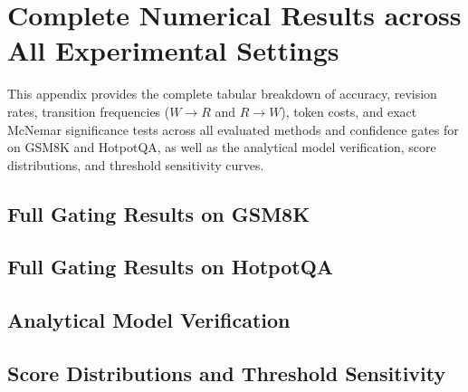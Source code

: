 \section{Complete Numerical Results across All Experimental Settings}
\label{app:full}
\label{app:full_results}

This appendix provides the complete tabular breakdown of accuracy, revision rates, transition frequencies ($W\to R$ and $R\to W$), token costs, and exact McNemar significance tests across all evaluated methods and confidence gates for \modelA{} on GSM8K and HotpotQA, as well as the analytical model verification, score distributions, and threshold sensitivity curves.

\subsection{Full Gating Results on GSM8K}
\label{app:tab_qwen_gsm8k}
\begin{table}[H]
\centering
\caption{Full gating results for \modelA{} on GSM8K ($N=400$ test questions).}
\label{tab:full_qwen_gsm8k}
\resizebox{\linewidth}{!}{}
\end{table}

\subsection{Full Gating Results on HotpotQA}
\label{app:tab_qwen_hotpotqa}
\begin{table}[H]
\centering
\caption{Full gating results for \modelA{} on HotpotQA ($N=400$ test questions).}
\label{tab:full_qwen_hotpotqa}
\resizebox{\linewidth}{!}{}
\end{table}

\subsection{Analytical Model Verification}
\label{app:analytical_model}
\begin{table}[H]
\centering
\caption{Comparison of predicted gated accuracy from the analytical model (Eq.~\ref{eq:gated}) against empirically observed gated accuracy on the test set ($N=400$ per dataset).}
\label{tab:model_check}
\resizebox{\linewidth}{!}{}
\end{table}

\subsection{Score Distributions and Threshold Sensitivity}
\label{app:distributions_and_sensitivity}

